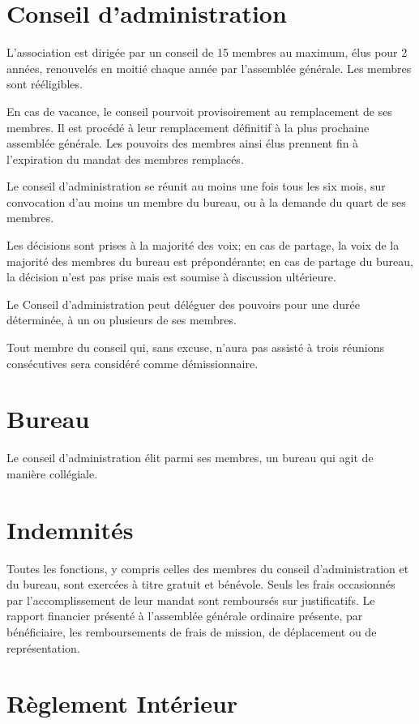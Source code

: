 \documentclass[11 pt]{article}
\begin{document}
\section{Conseil d’administration}

L’association est dirigée par un conseil de 15 membres au maximum,
élus pour 2 années, renouvelés en moitié chaque année par l’assemblée
générale. Les membres sont rééligibles.

En cas de vacance, le conseil pourvoit provisoirement au remplacement
de ses membres. Il est procédé à leur remplacement définitif à la
plus prochaine assemblée générale. Les pouvoirs des membres ainsi élus
prennent fin à l’expiration du mandat des membres remplacés.

Le conseil d’administration se réunit au moins une fois tous les six
mois, sur convocation d’au moins un membre du bureau, ou à la demande
du quart de ses membres.

Les décisions sont prises à la majorité des voix; en cas de partage,
la voix de la majorité des membres du bureau est prépondérante; en cas
de partage du bureau, la décision n’est pas prise mais est soumise à
discussion ultérieure.

Le Conseil d’administration peut déléguer des pouvoirs pour une durée
déterminée, à un ou plusieurs de ses membres.

Tout membre du conseil qui, sans excuse, n’aura pas assisté à trois
réunions consécutives sera considéré comme démissionnaire.


\section{Bureau}

Le conseil d’administration élit parmi ses membres, un bureau qui agit
de manière collégiale.

\section{Indemnités}

Toutes les fonctions, y compris celles des membres du conseil
d’administration et du bureau, sont exercées à titre gratuit et bénévole. Seuls les
frais occasionnés par l’accomplissement de leur mandat sont remboursés
sur justificatifs. Le rapport financier présenté à l’assemblée
générale ordinaire présente, par bénéficiaire, les remboursements de
frais de mission, de déplacement ou de représentation.

\section{Règlement Intérieur}
\end{document}
